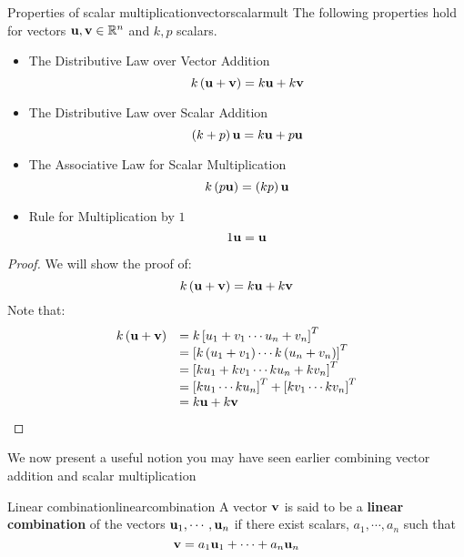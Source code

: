 \begin{theorem}{Properties of scalar multiplication}{vectorscalarmult}
The following properties hold for vectors ${\bf u},{\bf v}\in \mathbb{R}^{n}$ and $k,p $
scalars.
\begin{itemize}
\item The Distributive Law over Vector Addition
\begin{equation*}
k \left({\bf u}+{\bf v}\right) = k{\bf u}+ k{\bf v}
\end{equation*}
\item The Distributive Law over Scalar Addition
\begin{equation*}
\left(k + p  \right){\bf u} = k {\bf u}+p {\bf u}
\end{equation*}
\item The Associative Law for Scalar Multiplication
\begin{equation*}
k \left(p {\bf u}\right) = \left(k p \right){\bf u}
\end{equation*}
\item Rule for Multiplication by $1$
\begin{equation*}
1{\bf u}={\bf u}  
\end{equation*}
\end{itemize}
\end{theorem}

\begin{proof}
We will show the proof of: 
\begin{equation*}
k \left({\bf u}+{\bf v}\right) = k {\bf u}+ k {\bf v}
\end{equation*}
Note that:
\begin{equation*}
\begin{array}{ll}
k \left({\bf u}+{\bf v}\right) & =k \left[u_{1}+v_{1} \cdots u_{n}+v_{n}\right]^T \\
& = \left[k \left(u_{1}+v_{1}\right) \cdots k \left(u_{n}+v_{n}\right) \right]^T \\
& = \left[k u_{1}+ k  v_{1} \cdots k u_{n}+ k v_{n}\right]^T \\
& = \left[k u_{1} \cdots k u_{n} \right]^T + \left[k v_{1} \cdots k v_{n} \right]^T \\
& = k {\bf u}+k {\bf v} \\
\end{array}
\end{equation*}
\end{proof}

We now present a useful notion you may have seen earlier combining vector addition and scalar multiplication

\begin{definition}{Linear combination}{linearcombination}
A vector ${\bf v}$ is said to be a \textbf{linear combination} of the vectors ${\bf u}_1,\cdots , {\bf u}_n $ 
if there exist scalars, $a_{1},\cdots ,a_{n}$ such
that
\begin{equation*}
{\bf v} = a_1 {\bf u}_1 + \cdots + a_n {\bf u}_n
\end{equation*}
\end{definition}


